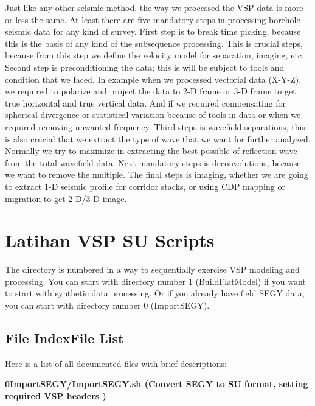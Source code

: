 \documentclass{article}
\begin{document}
\vspace{24pt}
Just like any other seismic method, the way we processed the VSP data is more or 
less the same. At least there are five mandatory steps in processing borehole seismic 
data for any kind of survey. First step is to break time picking, because this 
is the basis of any kind of the subsequence processing. This is crucial steps, 
because from this step we define the velocity model for separation, imaging, etc. 
Second step is preconditioning the data; this is will be subject to tools and condition 
that we faced. In example when we processed vectorial data (X-Y-Z), we required 
to polarize and project the data to 2-D frame or 3-D frame to get true horizontal 
and true vertical data. And if we required compensating for spherical divergence 
or statistical variation because of tools in data or when we required removing 
unwanted frequency. Third steps is wavefield separations, this is also crucial 
that we extract the type of wave that we want for further analyzed. Normally we 
try to maximize in extracting the best possible of reflection wave from the total 
wavefield data. Next mandatory steps is deconvolutions, because we want to remove 
the multiple. The final steps is imaging, whether we are going to extract 1-D seismic 
profile for corridor stacks, or using CDP mapping or migration to get 2-D/3-D image. 

\vspace{36pt}
\section*{{\LARGE{}\textbf{Latihan VSP SU Scripts}}}

\vspace{24pt}
The directory is numbered in a way to sequentially exercise VSP modeling and processing. 
You can start with directory number 1 (BuildFlatModel) if you want to start with 
synthetic data processing. Or if you already have field SEGY data, you can start 
with directory number 0 (ImportSEGY). 

\vspace{24pt}
\subsection*{\textbf{File Index}{\large{}\textbf{File List}}}

\vspace{12pt}
Here is a list of all documented files with brief descriptions:

\vspace{1pt}
\leftskip=18pt
\textbf{0ImportSEGY/ImportSEGY.sh (Convert SEGY to SU format, setting required 
VSP headers )}  \pageref{AAAAAAAAAB}
\end{document}
